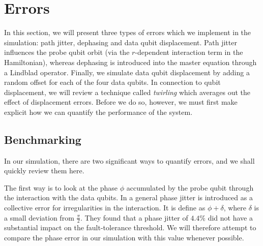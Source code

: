 \section{Errors} \label{sec:errors}
In this section, we will present three types of errors which we implement in the simulation: path jitter, dephasing and data qubit displacement. Path jitter influences the probe qubit orbit (via the $r$-dependent interaction term in the Hamiltonian), whereas dephasing is introduced into the master equation through a Lindblad operator. Finally, we simulate data qubit displacement by adding a random offset for each of the four data qubits. In connection to qubit displacement, we will review a technique called \emph{twirling} which averages out the effect of displacement errors. Before we do so, however, we must first make explicit how we can quantify the performance of the system. 

\subsection{Benchmarking}
In our simulation, there are two significant ways to quantify errors, and we shall quickly review them here.

The first way is to look at the phase $\phi$ accumulated by the probe qubit through the interaction with the data qubits. In \citet{OGorman2016} a general phase jitter is introduced as a collective error for irregularities in the interaction. It is define as $\phi + \delta$, where $\delta$ is a small deviation from $\frac{\pi}{2}$.  They found that a phase jitter of $4.4 \%$ did not have a substantial impact on the fault-tolerance threshold. We will therefore attempt to compare the phase error in our simulation with this value whenever possible. %

